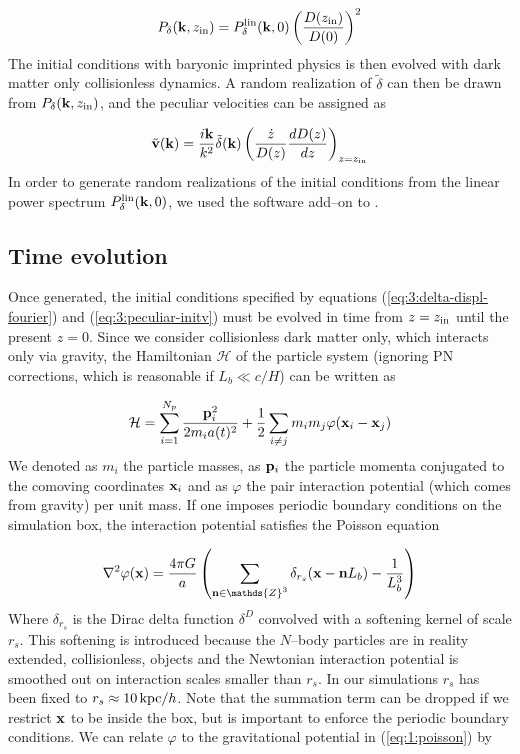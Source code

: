 \begin{equation}
\label{eq:3:hybrid-power}
P_\delta(\mathbf{k},z_{\rm in}) = P^{\rm lin}_\delta(\mathbf{k},0)\left(\frac{D(z_{\rm in})}{D(0)}\right)^2 
\end{equation}
%
The initial conditions with baryonic imprinted physics is then evolved with dark matter only collisionless dynamics. A random realization of $\tilde{\delta}$ can then be drawn from $P_\delta(\mathbf{k},z_{\rm in})$, and the peculiar velocities can be assigned as 

\begin{equation}
\label{eq:3:peculiar-initv}
\tilde{\mathbf{v}}(\mathbf{k}) = \frac{i\mathbf{k}}{k^2}\tilde{\delta}(\mathbf{k})\left(\frac{\dot{z}}{D(z)}\frac{dD(z)}{dz}\right)_{z=z_{\rm in}}
\end{equation}  
%
In order to generate random realizations of the initial conditions from the linear power spectrum $P^{\rm lin}_\delta(\mathbf{k},0)$, we used the  software add--on to  \citep{gadget2}.   

\subsection{Time evolution}
Once generated, the initial conditions specified by equations (\ref{eq:3:delta-displ-fourier}) and (\ref{eq:3:peculiar-initv}) must be evolved in time from $z=z_{\rm in}$ until the present $z=0$. Since we consider collisionless dark matter only, which interacts only via gravity, the Hamiltonian $\mathcal{H}$ of the particle system (ignoring PN corrections, which is reasonable if $L_b\ll c/H$) can be written as 

\begin{equation}
\label{eq:3:collisionless-ham}
\mathcal{H} = \sum_{i=1}^{N_p} \frac{\mathbf{p}_i^2}{2m_i a(t)^2} + \frac{1}{2}\sum_{i\neq j}m_im_j\varphi(\mathbf{x}_i-\mathbf{x}_j)
\end{equation} 
%
We denoted as $m_i$ the particle masses, as $\mathbf{p}_i$ the particle momenta conjugated to the comoving coordinates $\mathbf{x}_i$ and as $\varphi$ the pair interaction potential (which comes from gravity) per unit mass. If one imposes periodic boundary conditions on the simulation box, the interaction potential satisfies the Poisson equation

\begin{equation}
\label{eq:3:part-poisson}
\nabla^2\varphi(\bb{x}) = \frac{4\pi G}{a}\left(\sum_{\bb{n}\in\mathds{Z}^3}\delta_{r_s}(\bb{x}-\bb{n}L_b)-\frac{1}{L_b^3}\right) 
\end{equation}
%
Where $\delta_{r_s}$ is the Dirac delta function $\delta^D$ convolved with a softening kernel of scale $r_s$. This softening is introduced because the $N$--body particles are in reality extended, collisionless, objects and the Newtonian interaction potential is smoothed out on interaction scales smaller than $r_s$. In our simulations $r_s$ has been fixed to $r_s\approx 10\,{\rm kpc}/h$. Note that the summation term can be dropped if we restrict $\mathbf{x}$ to be inside the box, but is important to enforce the periodic boundary conditions. We can relate $\varphi$ to the gravitational potential in (\ref{eq:1:poisson}) by    

